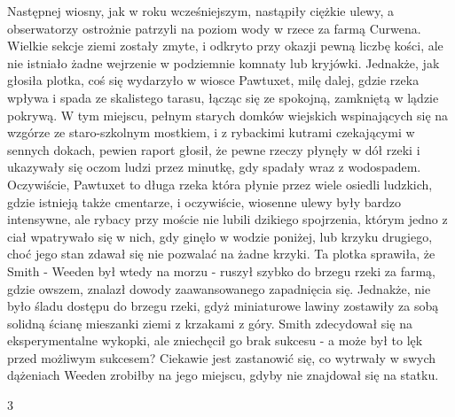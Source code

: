 Następnej wiosny, jak w roku wcześniejszym, nastąpiły ciężkie ulewy, a obserwatorzy ostrożnie patrzyli na poziom wody w rzece za farmą Curwena. Wielkie sekcje ziemi zostały zmyte, i odkryto przy okazji pewną liczbę kości, ale nie istniało żadne wejrzenie w podziemnie komnaty lub kryjówki. Jednakże, jak głosiła plotka,  coś się wydarzyło w wiosce Pawtuxet, milę dalej, gdzie rzeka wpływa i spada ze skalistego tarasu, łącząc się ze spokojną, zamkniętą w lądzie pokrywą. W tym miejscu, pełnym starych domków wiejskich wspinających się na wzgórze ze staro-szkolnym mostkiem, i z rybackimi kutrami czekającymi w sennych dokach, pewien raport głosił, że pewne rzeczy płynęły w dół rzeki i ukazywały się oczom ludzi przez minutkę, gdy spadały wraz z wodospadem. Oczywiście, Pawtuxet to długa rzeka która płynie przez wiele osiedli ludzkich, gdzie istnieją także cmentarze, i oczywiście, wiosenne ulewy były bardzo intensywne, ale rybacy przy moście nie lubili dzikiego spojrzenia, którym jedno z ciał wpatrywało się w nich, gdy ginęło w wodzie poniżej, lub krzyku drugiego, choć jego stan zdawał się nie pozwalać na żadne krzyki. Ta plotka sprawiła, że Smith - Weeden był wtedy na morzu - ruszył szybko do brzegu rzeki za farmą, gdzie owszem, znalazł dowody zaawansowanego zapadnięcia się. Jednakże, nie było śladu dostępu do brzegu rzeki, gdyż miniaturowe lawiny zostawiły za sobą solidną ścianę mieszanki ziemi z krzakami z góry. Smith zdecydował się na eksperymentalne wykopki, ale zniechęcił go brak sukcesu - a może był to lęk przed możliwym sukcesem? Ciekawie jest zastanowić się, co wytrwały w swych dążeniach Weeden zrobiłby na jego miejscu, gdyby nie znajdował się na statku.

\begin{center}
3
\end{center}

